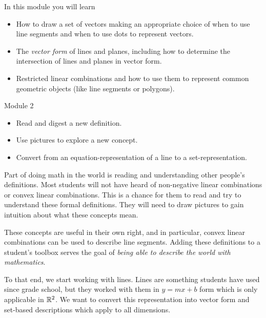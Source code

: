 \documentclass{workbook}
\begin{document}
\begin{module}\label{MODULELINESANDPLANES}

	In this module you will learn
	\begin{itemize}
		\item How to draw a set of vectors making an appropriate choice of when to use
			line segments and when to use dots to represent vectors.
		\item The \emph{vector form} of lines and planes, including how to determine
			the intersection of lines and planes in vector form.
		\item Restricted linear combinations and how to use them to represent common geometric
			objects (like line segments or polygons).
	\end{itemize}

	
	

\end{module}
\begin{lesson}

	Module 2

	\begin{itemize}
		\item Read and digest a new definition.

		\item Use pictures to explore a new concept.

		\item Convert from an equation-representation of a line to a set-representation.
	\end{itemize}

	 Part of doing math in the world is reading and understanding
	other people's definitions. Most students will not have heard of non-negative
	linear combinations or convex linear combinations. This is a chance for them
	to read and try to understand these formal definitions. They will need to
	draw pictures to gain intuition about what these concepts mean.

	These concepts are useful in their own right, and in particular, convex linear
	combinations can be used to describe line segments. Adding these definitions
	to a student's toolbox serves the goal of \emph{being able to describe
	the world with mathematics}.

	To that end, we start working with lines. Lines are something students have
	used since grade school, but they worked with them in $y=mx+b$ form which
	is only applicable in $\mathbb{R}^{2}$. We want to convert this representation
	into vector form and set-based descriptions which apply to all
	dimensions.

\end{lesson}
\end{document}
